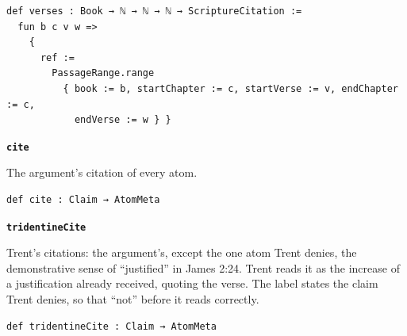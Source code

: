 \documentclass[11pt,paper=\testimonypaper,DIV=13,parskip=false]{scrartcl}
\begin{document}
{\small\begin{verbatim}
def verses : Book → ℕ → ℕ → ℕ → ScriptureCitation :=
  fun b c v w =>
    {
      ref :=
        PassageRange.range
          { book := b, startChapter := c, startVerse := v, endChapter := c,
            endVerse := w } }
\end{verbatim}}
\par\medskip\noindent\textbf{\texttt{cite}}\par\nobreak\noindent
The argument’s citation of every atom.

{\small\begin{verbatim}
def cite : Claim → AtomMeta
\end{verbatim}}
\par\medskip\noindent\textbf{\texttt{tridentine\allowbreak{}Cite}}\par\nobreak\noindent
Trent’s citations: the argument’s, except the one atom Trent denies, the demonstrative sense of “justified” in James 2:24. Trent reads it as the increase of a justification already received, quoting the verse. The label states the claim Trent denies, so that “not” before it reads correctly.

{\small\begin{verbatim}
def tridentineCite : Claim → AtomMeta
\end{verbatim}}



\end{document}
